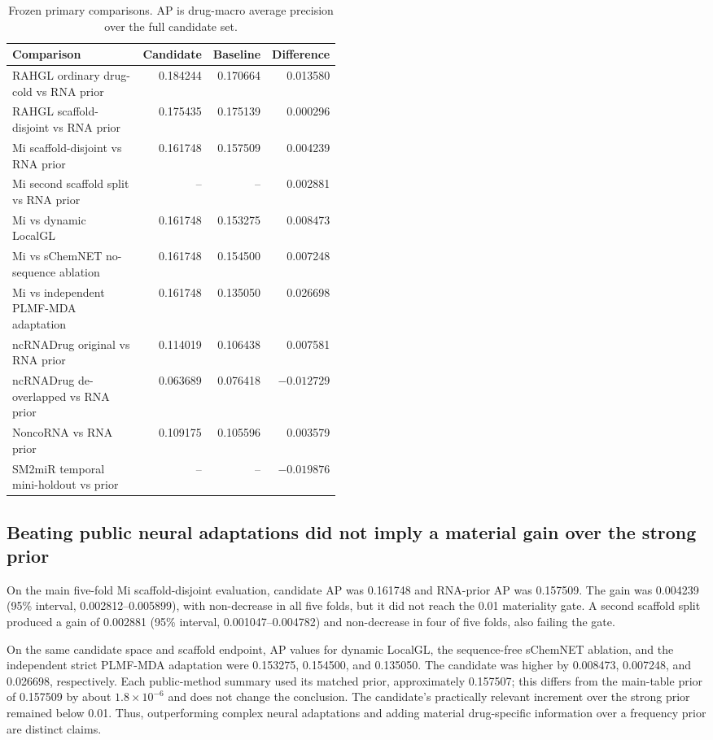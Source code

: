 \documentclass[10pt]{article}
\begin{document}
\begin{table}[htbp]
\centering
\caption{Frozen primary comparisons. AP is drug-macro average precision over the full candidate set.}
\label{tab:main}
\small
\begin{tabular}{p{0.47\linewidth}rrr}
\toprule
Comparison & Candidate & Baseline & Difference \\
\midrule
RAHGL ordinary drug-cold vs RNA prior & 0.184244 & 0.170664 & 0.013580 \\
RAHGL scaffold-disjoint vs RNA prior & 0.175435 & 0.175139 & 0.000296 \\
Mi scaffold-disjoint vs RNA prior & 0.161748 & 0.157509 & 0.004239 \\
Mi second scaffold split vs RNA prior & -- & -- & 0.002881 \\
Mi vs dynamic LocalGL & 0.161748 & 0.153275 & 0.008473 \\
Mi vs sChemNET no-sequence ablation & 0.161748 & 0.154500 & 0.007248 \\
Mi vs independent PLMF-MDA adaptation & 0.161748 & 0.135050 & 0.026698 \\
ncRNADrug original vs RNA prior & 0.114019 & 0.106438 & 0.007581 \\
ncRNADrug de-overlapped vs RNA prior & 0.063689 & 0.076418 & $-0.012729$ \\
NoncoRNA vs RNA prior & 0.109175 & 0.105596 & 0.003579 \\
SM2miR temporal mini-holdout vs prior & -- & -- & $-0.019876$ \\
\bottomrule
\end{tabular}
\end{table}

\subsection{Beating public neural adaptations did not imply a material gain over the strong prior}

On the main five-fold Mi scaffold-disjoint evaluation, candidate AP was 0.161748 and RNA-prior AP was 0.157509. The gain was 0.004239 (95\% interval, 0.002812--0.005899), with non-decrease in all five folds, but it did not reach the 0.01 materiality gate. A second scaffold split produced a gain of 0.002881 (95\% interval, 0.001047--0.004782) and non-decrease in four of five folds, also failing the gate.

On the same candidate space and scaffold endpoint, AP values for dynamic LocalGL, the sequence-free sChemNET ablation, and the independent strict PLMF-MDA adaptation were 0.153275, 0.154500, and 0.135050. The candidate was higher by 0.008473, 0.007248, and 0.026698, respectively. Each public-method summary used its matched prior, approximately 0.157507; this differs from the main-table prior of 0.157509 by about $1.8\times10^{-6}$ and does not change the conclusion. The candidate's practically relevant increment over the strong prior remained below 0.01. Thus, outperforming complex neural adaptations and adding material drug-specific information over a frequency prior are distinct claims.
\end{document}
